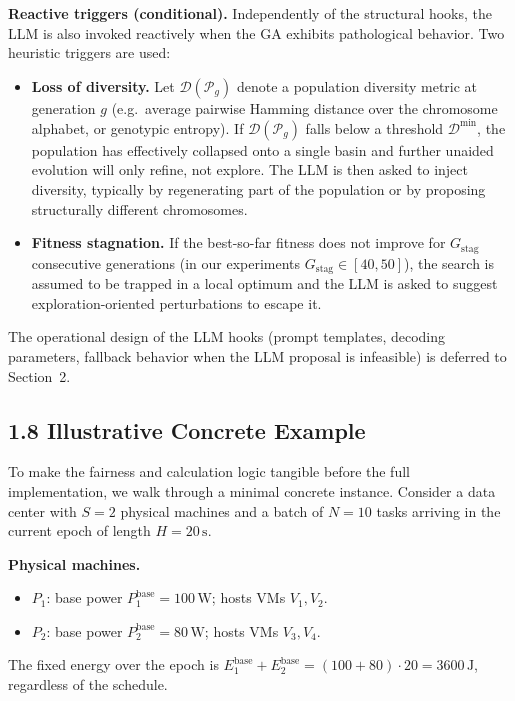 \documentclass[11pt,a4paper]{article}
\begin{document}
\textbf{Reactive triggers (conditional).} Independently of the structural hooks, the LLM is also invoked reactively when the GA exhibits pathological behavior. Two heuristic triggers are used:
\begin{itemize}[leftmargin=2em,itemsep=2pt]
  \item \textbf{Loss of diversity.} Let $\mathcal{D}(\mathcal{P}_g)$ denote a population diversity metric at generation $g$ (e.g.\ average pairwise Hamming distance over the chromosome alphabet, or genotypic entropy). If $\mathcal{D}(\mathcal{P}_g)$ falls below a threshold $\mathcal{D}^{\min}$, the population has effectively collapsed onto a single basin and further unaided evolution will only refine, not explore. The LLM is then asked to inject diversity, typically by regenerating part of the population or by proposing structurally different chromosomes.
  \item \textbf{Fitness stagnation.} If the best-so-far fitness does not improve for $G_{\text{stag}}$ consecutive generations (in our experiments $G_{\text{stag}} \in [40, 50]$), the search is assumed to be trapped in a local optimum and the LLM is asked to suggest exploration-oriented perturbations to escape it.
\end{itemize}

The operational design of the LLM hooks (prompt templates, decoding parameters, fallback behavior when the LLM proposal is infeasible) is deferred to Section~2.

\subsection*{1.8 Illustrative Concrete Example}

To make the fairness and calculation logic tangible before the full implementation, we walk through a minimal concrete instance. Consider a data center with $S = 2$ physical machines and a batch of $N = 10$ tasks arriving in the current epoch of length $H = 20\,\text{s}$.

\textbf{Physical machines.}
\begin{itemize}[leftmargin=2em,itemsep=2pt]
  \item $P_1$: base power $P^{\text{base}}_1 = 100\,\text{W}$; hosts VMs $V_1, V_2$.
  \item $P_2$: base power $P^{\text{base}}_2 = 80\,\text{W}$; hosts VMs $V_3, V_4$.
\end{itemize}
The fixed energy over the epoch is $E^{\text{base}}_1 + E^{\text{base}}_2 = (100 + 80) \cdot 20 = 3600\,\text{J}$, regardless of the schedule.
\end{document}
